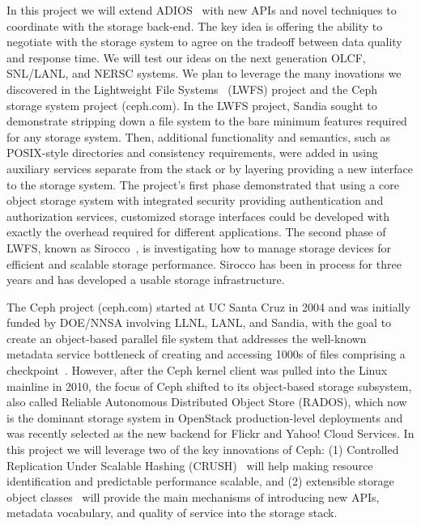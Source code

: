 In this project we will extend ADIOS~\cite{adios} with new APIs and novel techniques
to coordinate with the storage back-end. The key idea is offering the ability to
negotiate with the storage system to agree on the tradeoff between data quality
and response time. We will test our ideas on the next generation OLCF,
SNL/LANL, and NERSC systems.
%
We plan to leverage the many inovations we discovered in 
the Lightweight File Systems~\cite{lwfs} (LWFS) project and the Ceph storage system project (ceph.com).
In the LWFS project, Sandia sought to
demonstrate stripping down a file system to the bare minimum features required
for any storage system. Then, additional functionality and semantics, such as
POSIX-style directories and consistency requirements, were added in using
auxiliary services separate from the stack or by layering providing a new
interface to the storage system. The project's first phase demonstrated that
using a core object storage system with integrated security providing
authentication and authorization services, customized storage interfaces could
be developed with exactly the overhead required for different applications. The
second phase of LWFS, known as Sirocco~\cite{sirocco}, is investigating how to
manage storage devices for efficient and scalable storage performance.  Sirocco
has been in process for three years and has developed a usable storage infrastructure.

The Ceph project (ceph.com) started at UC Santa Cruz in 2004 and
was initially funded by DOE/NNSA involving LLNL, LANL, and Sandia,
with the goal to create an object-based parallel file system that
addresses the well-known metadata service bottleneck of creating
and accessing 1000s of files comprising a checkpoint~\cite{weil:osdi06}.
However, after the Ceph kernel client was pulled into the Linux
mainline in 2010, the focus of Ceph shifted to its object-based
storage subsystem, also called Reliable Autonomous Distributed
Object Store (RADOS), which now is the dominant storage system in
OpenStack production-level deployments and was recently selected
as the new backend for Flickr and Yahoo! Cloud Services. In this
project we will leverage two of the key innovations of Ceph: (1)
Controlled Replication Under Scalable Hashing (CRUSH)~\cite{weil:sc06}
will help making resource identification and predictable performance
scalable, and (2) extensible storage object classes~\cite{watkins:ucsctr15}
will provide the main mechanisms of introducing new APIs,
metadata vocabulary, and quality of service into the storage stack.


